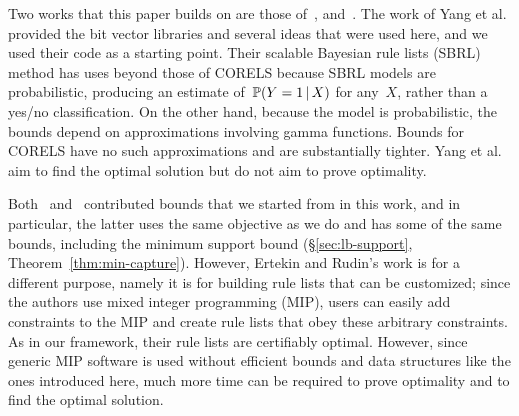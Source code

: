 \begin{arxiv}
Two works that this paper builds on are those of~\citet{YangRuSe16}, and~\citet{RudinEr15}.
%
The work of Yang et al. provided the bit vector libraries and several ideas that were used here,
and we used their code as a starting point.
%
Their scalable Bayesian rule lists (SBRL) method has uses beyond those of CORELS because SBRL models are probabilistic,
producing an estimate of~${\mathbb{P}(Y=1 \,|\, X)}$ for any~$X$, rather than a yes/no classification.
%
On the other hand, because the model is probabilistic, the bounds depend on approximations
involving gamma functions.
%
Bounds for CORELS have no such approximations and are substantially tighter.
%
Yang et al. aim to find the optimal solution but do not aim to prove optimality.

Both~\citet{YangRuSe16} and~\citet{RudinEr15} contributed bounds that we started from
in this work, and in particular, the latter uses the same objective as we do and has
some of the same bounds, including the minimum support bound (\S\ref{sec:lb-support}, Theorem~\ref{thm:min-capture}).
%
However, Ertekin and Rudin's work is for a different purpose,
namely it is for building rule lists that can be customized;
since the authors use mixed integer programming (MIP), users can easily
add constraints to the MIP and create rule lists that obey these arbitrary constraints.
%
As in our framework, their rule lists are certifiably optimal.
%
However, since generic MIP software is used without efficient bounds and
data structures like the ones introduced here,
much more time can be required to prove optimality and to find the optimal solution.
\end{arxiv}






